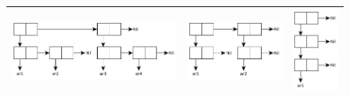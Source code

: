 \documentclass[a4paper]{report}
\begin{document}
\begin{figure}[!h]
	\begin{tabular}{|l|l|l|}
		\hline
		\includegraphics[scale=0.625]{inc/img/task0501.pdf} & \includegraphics[scale=0.625]{inc/img/task0502.pdf} & \includegraphics[scale=0.625]{inc/img/task0503.pdf} \\\hline
	\end{tabular}
\end{figure}
\end{document}
